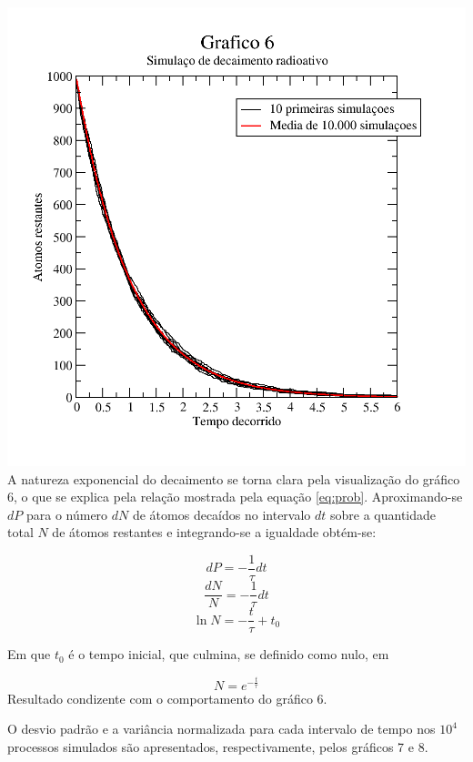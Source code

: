 \message{ !name(relatorio.tex)}\documentclass{article}
\begin{document}
\includegraphics[width=\textwidth]{graf6}
A natureza exponencial do decaimento se torna clara pela visualização do gráfico 6, o que se explica pela relação mostrada pela equação \ref{eq:prob}.
Aproximando-se $dP$ para o número $dN$ de átomos decaídos no intervalo $dt$ sobre a quantidade total $N$ de átomos restantes e integrando-se a igualdade obtém-se:

\[dP=-\frac{1}{\tau}dt\]
\[\frac{dN}{N} =- \frac{1}{\tau}dt\]
\[\ln N = -\frac{t}{\tau} + t_0\]

Em que $t_0$ é o tempo inicial, que culmina, se definido como nulo, em 

\[N = e^{-\frac{t}{\tau}}\]
Resultado condizente com o comportamento do gráfico 6.

O desvio padrão e a variância normalizada para cada intervalo de tempo nos $10^4$ processos simulados são apresentados, respectivamente, pelos gráficos 7 e 8.
\end{document}
